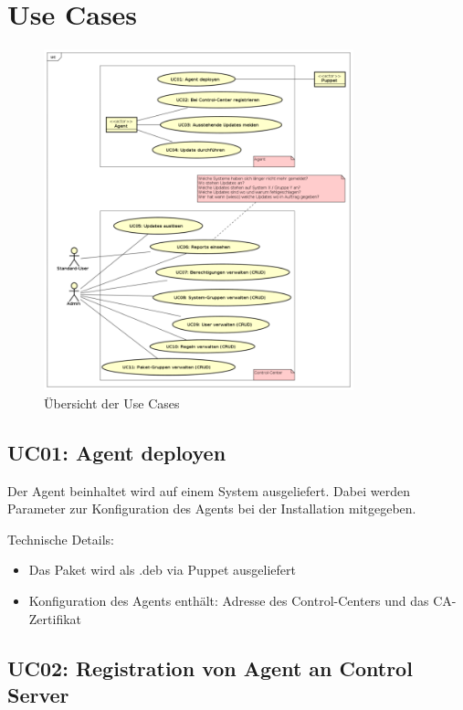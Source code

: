 \section{Use Cases}


\begin{figure}
  \centering
    \includegraphics[width=0.8\textwidth]{files/UseCases_small}
  \caption{Übersicht der Use Cases}
  \label{fig:usecases}
\end{figure}

\xxx[finish]

\subsection*{UC01: Agent deployen}
\label{sec:uc_01}

Der Agent beinhaltet wird auf einem System ausgeliefert. Dabei werden Parameter zur Konfiguration des Agents bei der Installation mitgegeben.


Technische Details:

\begin{itemize}
    \item Das Paket wird als .deb via Puppet ausgeliefert
    \item Konfiguration des Agents enthält: Adresse des Control-Centers und das CA-Zertifikat
\end{itemize}


\subsection*{UC02: Registration von Agent an Control Server}
\label{sec:uc_02}

